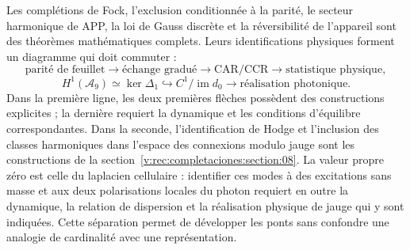 Les complétions de Fock, l’exclusion conditionnée à la parité, le secteur
harmonique de APP, la loi de Gauss discrète et la réversibilité de l’appareil sont des théorèmes
mathématiques complets. Leurs identifications physiques forment un diagramme qui
doit commuter :
\[
 \text{parité de feuillet}
 \longrightarrow\text{échange gradué}
 \longrightarrow\text{CAR/CCR}
 \longrightarrow\text{statistique physique},
\]
\[
 H^1(\mathcal A_9)\simeq\ker\Delta_1
 \hookrightarrow C^1/\operatorname{im}d_0
 \longrightarrow\text{réalisation photonique}.
\]
Dans la première ligne, les deux premières flèches possèdent des constructions
explicites ; la dernière requiert la dynamique et les conditions d’équilibre
correspondantes. Dans la seconde, l’identification de Hodge et l’inclusion
des classes harmoniques dans l’espace des connexions modulo jauge sont les
constructions de la section~\ref{v:rec:completaciones:section:08}. La valeur propre
zéro est celle du laplacien cellulaire : identifier ces modes à des excitations
sans masse et aux deux polarisations locales du photon requiert en outre la
dynamique, la relation de dispersion et la réalisation physique de jauge qui y sont
indiquées. Cette séparation permet de développer les ponts sans confondre une
analogie de cardinalité avec une représentation.
